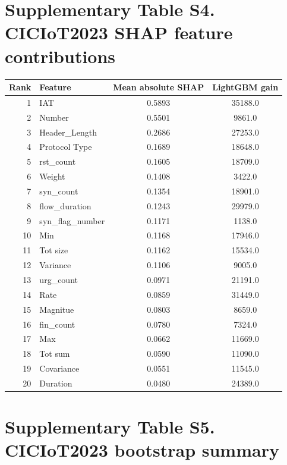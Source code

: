 \documentclass[10pt]{article}
\begin{document}
\section*{Supplementary Table S4. CICIoT2023 SHAP feature contributions}

\begin{center}
\small
\begin{tabular}{r l c c}
\toprule
Rank & Feature & Mean absolute SHAP & LightGBM gain \\
\midrule
1 & IAT & 0.5893 & 35188.0 \\
2 & Number & 0.5501 & 9861.0 \\
3 & Header\_Length & 0.2686 & 27253.0 \\
4 & Protocol Type & 0.1689 & 18648.0 \\
5 & rst\_count & 0.1605 & 18709.0 \\
6 & Weight & 0.1408 & 3422.0 \\
7 & syn\_count & 0.1354 & 18901.0 \\
8 & flow\_duration & 0.1243 & 29979.0 \\
9 & syn\_flag\_number & 0.1171 & 1138.0 \\
10 & Min & 0.1168 & 17946.0 \\
11 & Tot size & 0.1162 & 15534.0 \\
12 & Variance & 0.1106 & 9005.0 \\
13 & urg\_count & 0.0971 & 21191.0 \\
14 & Rate & 0.0859 & 31449.0 \\
15 & Magnitue & 0.0803 & 8659.0 \\
16 & fin\_count & 0.0780 & 7324.0 \\
17 & Max & 0.0662 & 11669.0 \\
18 & Tot sum & 0.0590 & 11090.0 \\
19 & Covariance & 0.0551 & 11545.0 \\
20 & Duration & 0.0480 & 24389.0 \\
\bottomrule
\end{tabular}
\end{center}

\section*{Supplementary Table S5. CICIoT2023 bootstrap summary}
\end{document}

